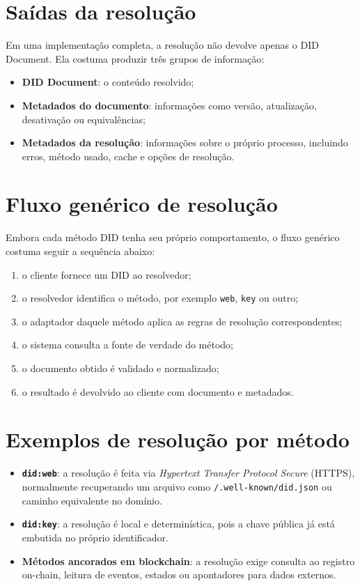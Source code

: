 \section{Saídas da resolução}
Em uma implementação completa, a resolução não devolve apenas o DID Document. Ela costuma produzir três grupos de informação:
\begin{itemize}[leftmargin=*]
  \item \textbf{DID Document}: o conteúdo resolvido;
  \item \textbf{Metadados do documento}: informações como versão, atualização, desativação ou equivalências;
  \item \textbf{Metadados da resolução}: informações sobre o próprio processo, incluindo erros, método usado, cache e opções de resolução.
\end{itemize}

\section{Fluxo genérico de resolução}
Embora cada método DID tenha seu próprio comportamento, o fluxo genérico costuma seguir a sequência abaixo:
\begin{enumerate}[leftmargin=*]
  \item o cliente fornece um DID ao resolvedor;
  \item o resolvedor identifica o método, por exemplo \texttt{web}, \texttt{key} ou outro;
  \item o adaptador daquele método aplica as regras de resolução correspondentes;
  \item o sistema consulta a fonte de verdade do método;
  \item o documento obtido é validado e normalizado;
  \item o resultado é devolvido ao cliente com documento e metadados.
\end{enumerate}

\section{Exemplos de resolução por método}
\begin{itemize}[leftmargin=*]
  \item \textbf{\texttt{did:web}}: a resolução é feita via \textit{Hypertext Transfer Protocol Secure} (HTTPS), normalmente recuperando um arquivo como \texttt{/.well-known/did.json} ou caminho equivalente no domínio.
  \item \textbf{\texttt{did:key}}: a resolução é local e determinística, pois a chave pública já está embutida no próprio identificador.
  \item \textbf{Métodos ancorados em blockchain}: a resolução exige consulta ao registro on-chain, leitura de eventos, estados ou apontadores para dados externos.
\end{itemize}

